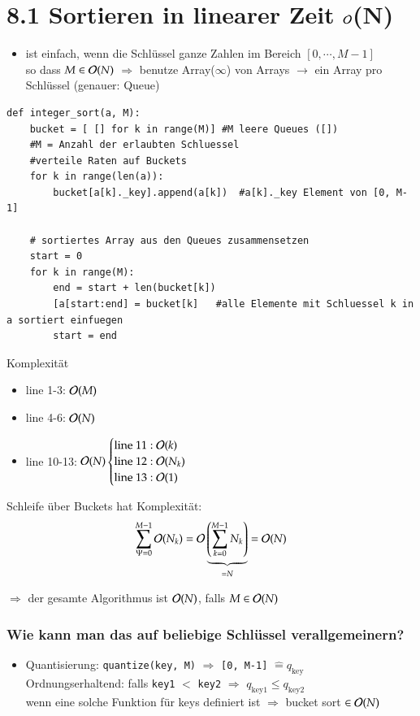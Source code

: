 \section*{8.1 Sortieren in linearer Zeit $\mathcal{O}{}$(N)}
\begin{itemize}
    \item ist einfach, wenn die Schlüssel ganze Zahlen im Bereich $[0, \cdots, M-1]$ \\
    so dass $M \in \mathcal{O}{}(N)$ $\Rightarrow$ benutze Array($\infty$) von Arrays $\rightarrow$ ein Array pro Schlüssel (genauer: Queue)
\end{itemize}
\begin{verbatim}
def integer_sort(a, M):
    bucket = [ [] for k in range(M)] #M leere Queues ([])
    #M = Anzahl der erlaubten Schluessel
    #verteile Raten auf Buckets
    for k in range(len(a)):
        bucket[a[k]._key].append(a[k])  #a[k]._key Element von [0, M-1]

    # sortiertes Array aus den Queues zusammensetzen
    start = 0
    for k in range(M):
        end = start + len(bucket[k])
        [a[start:end] = bucket[k]   #alle Elemente mit Schluessel k in a sortiert einfuegen
        start = end
\end{verbatim}
Komplexität
\begin{itemize}
    \item line 1-3: $\mathcal{O}{}(M)$
    \item line 4-6: $\mathcal{O}{}(N)$
    \item line 10-13: $\mathcal{O}{}(N) \begin{cases} \text{line 11}: \mathcal{O}{}(k) \\ \text{line 12}: \mathcal{O}{}(N_k) \\ \text{line 13}: \mathcal{O}{}(1) \end{cases}$
\end{itemize}
Schleife über Buckets hat Komplexität: \[\sum_{\Psi = 0}^{M-1} \mathcal{O}{}(N_k) = \mathcal{O}{}\underbrace{\left(\sum_{k = 0}^{M-1}N_k\right)}_{=N} = \mathcal{O}{}(N)\]

$\Rightarrow$ der gesamte Algorithmus ist $\mathcal{O}{}(N)$, falls $M \in \mathcal{O}{}(N)$ \\

\subsubsection*{Wie kann man das auf beliebige Schlüssel verallgemeinern?}
\begin{itemize}
\item Quantisierung: \verb|quantize(key, M)| $\Rightarrow$ \verb|[0, M-1]| $\widehat{=} q_{\text{key}}$ \\
\hspace*{0.1cm} Ordnungserhaltend: falls \verb|key1| $<$ \verb|key2| $\Rightarrow$ $q_{\text{key1}} \leq q_{\text{key2}}$ \\
wenn eine solche Funktion für keys definiert ist $\Rightarrow$ bucket sort $\in \mathcal{O}{}(N)$
\end{itemize}

